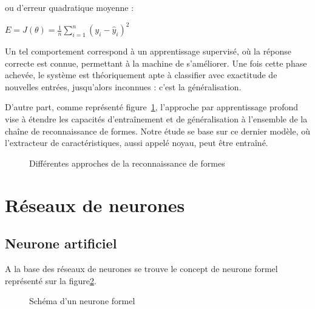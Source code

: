 \documentclass[12pt]{report}
\begin{document}
ou d'erreur quadratique moyenne\cite{Bib_WikiMSE} :

\begin{center} $ E = J({\theta}) =  \frac{1}{n}\sum\limits_{i=1}^{n} (y_{i} - \hat{y}_{i})^2 $ \end{center}

Un tel comportement correspond à un apprentissage supervisé, où la réponse correcte est connue, permettant à la machine de s'améliorer. Une fois cette phase achevée, le système est théoriquement apte à
classifier avec exactitude de nouvelles entrées, jusqu'alors inconnues : c'est la généralisation.
\par
D'autre part, comme représenté figure~\ref{fig:c1p1s2}, l'approche par apprentissage profond vise à étendre les capacités d'entraînement et de généralisation à l'ensemble de la chaîne de reconnaissance de formes.
Notre étude se base sur ce dernier modèle, où l'extracteur de caractéristiques, aussi appelé noyau, peut être entraîné.

\begin{figure}[H]
    \centering
    \makebox[\textwidth]{}
    \caption{Différentes approches de la reconnaissance de formes}
    \label{fig:c1p1s2}
\end{figure}

\section{Réseaux de neurones}

\subsection{Neurone artificiel}

A la base des réseaux de neurones se trouve le concept de neurone formel représenté sur la figure\ref{fig:c1p2s1}.
\par
\begin{figure}[H]
    \centering
    \makebox[\textwidth]{}
    \caption{Schéma d'un neurone formel}
    \label{fig:c1p2s1}
\end{figure}
\end{document}
